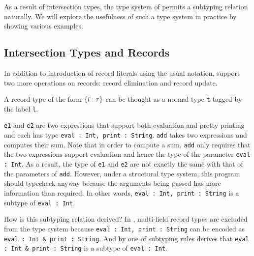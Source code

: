 {As a result of intersection types, the type system of \name permits a subtyping
relation naturally. We will explore the usefulness of such a type system in
practice by showing various examples.

\subsection{Intersection Types and Records}

In addition to introduction of record literals using the usual
notation, \name support two more operations on records: record
elimination and record update.

A record type of the form $ \{ l : \tau \} $ can be thought as a normal type \lstinline{t}
tagged by the label \lstinline{l}.



\lstinline{e1} and \lstinline{e2} are two expressions that support both evaluation and pretty
printing and each has type \lstinline{eval : Int, print : String}. \lstinline{add} takes
two expressions and computes their sum. Note that in order to compute a sum,
\lstinline{add} only requires that the two expressions support evaluation and hence the
type of the parameter \lstinline{eval : Int}. As a result, the type of \lstinline{e1} and
\lstinline{e2} are not exactly the same with that of the parameters of \lstinline{add}. However,
under a structural type system, this program should typecheck anyway because the
arguments being passed has more information than required. In other words,
\lstinline{eval : Int, print : String} is a subtype of \lstinline{eval : Int}.

How is this subtyping relation derived? In \name, multi-field record types are
excluded from the type system because \lstinline{eval : Int, print : String} can
be encoded as \lstinline{eval : Int & print : String}. And by one of
subtyping rules derives that \lstinline{eval : Int & print : String} is a
subtype of \lstinline{eval : Int}.

}
